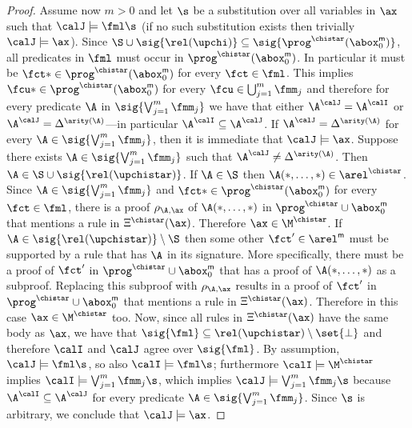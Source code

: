 \begin{proof}
Assume now $m>0$ and let $\s$ be a substitution over all variables in $\ax$ such that 
$\calJ\models\fml\s$
(if no such substitution exists then 
trivially $\calJ\models \ax$). 
Since $\S\cup\sig{\rel(\upchi)}\subseteq \sig{\prog^{\chistar}(\abox_0^{\mathsf{m}})}$,
all predicates in $\fml$ must occur in $\prog^{\chistar}(\abox_0^{\mathsf{m}})$.
In particular it must be $\fct*\in\prog^{\chistar}(\abox_0^{\mathsf{m}})$ for every $\fct\in\fml$. 
This implies $\fcu*\in\prog^{\chistar}(\abox_0^{\mathsf{m}})$ for every $\fcu\in\bigcup_{j=1}^m\fmm_j$
and therefore for every predicate $\A$ in 
$\sig{\bigvee_{j=1}^m  \fmm_j}$ we have that either $\A^{\calJ} = \A^{\calI}$
or $\A^{\calJ} = \Delta^{\arity(\A)}$---in particular $\A^{\calI} \subseteq \A^{\calJ}$.
%
If $\A^{\calJ} = \Delta^{\arity(\A)}$ for every $\A\in\sig{\bigvee_{j=1}^m \fmm_j}$,
then it is immediate that $\calJ\models \ax$. Suppose there exists 
$\A\in\sig{\bigvee_{j=1}^m \fmm_j}$ such that $\A^{\calJ} \neq \Delta^{\arity(\A)}$.
Then $\A\in\S\cup\sig{\rel(\upchistar)}$.
%
If $\A\in\S$ then $\A(*,\dots,*)\in\arel^{\chistar}$.
Since $\A\in\sig{\bigvee_{j=1}^m\fmm_j}$ and 
$\fct*\in\prog^{\chistar}(\abox_0^{\mathsf{m}})$ for every $\fct\in\fml$, 
there is a proof $\rho_{\A,\ax}$ of $\A(*,\dots,*)$ in 
$\prog^{\chistar}\cup\abox_0^{\mathsf{m}}$ 
that mentions a rule in $\Xi^{\chistar}(\ax)$. Therefore $\ax\in\M^{\chistar}$.
%
If $\A\in\sig{\rel(\upchistar)}\setminus\S$ then some other $\fct'\in\arel^{\mathsf{m}}$
must be supported by a rule that has $\A$ in its signature.
More specifically, there must be a proof of $\fct'$ in $\prog^{\chistar}\cup\abox_0^{\mathsf{m}}$
that has a proof of $\A(*,\dots,*)$ as a subproof.
Replacing this subproof with $\rho_{\A,\ax}$ results in a proof of $\fct'$ in 
$\prog^{\chistar}\cup\abox_0^{\mathsf{m}}$ that mentions a rule in $\Xi^{\chistar}(\ax)$. 
Therefore in this case $\ax\in\M^{\chistar}$ too.
%
Now, since all rules in $\Xi^{\chistar}(\ax)$ have the same body as $\ax$, we have that 
$\sig{\fml}\subseteq \rel(\upchistar)\setminus\set{\bot}$ and therefore $\calI$ and $\calJ$ agree over $\sig{\fml}$. 
By assumption, $\calJ\models\fml\s$, so also $\calI\models\fml\s$;
furthermore $\calI\models\M^{\chistar}$ implies
$\calI\models\bigvee_{j=1}^m  \fmm_j\s$, which implies 
$\calJ\models\bigvee_{j=1}^m  \fmm_j\s$ because 
$\A^{\calI} \subseteq \A^{\calJ}$
for every predicate $\A\in\sig{\bigvee_{j=1}^m  \fmm_j}$. 
Since $\s$ is arbitrary, we conclude that $\calJ\models \ax$.
\end{proof}













